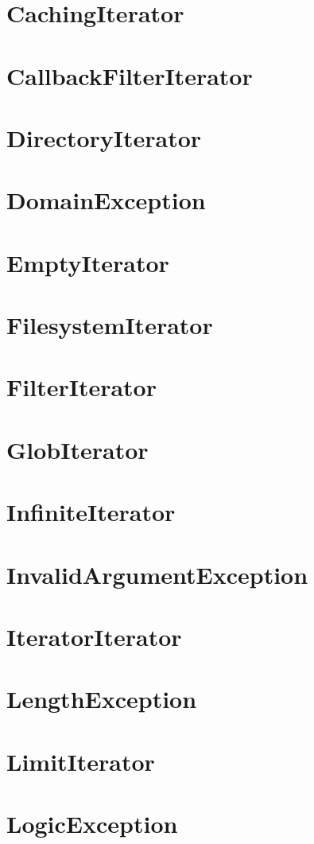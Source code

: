 \section{CachingIterator}
\section{CallbackFilterIterator}
\section{DirectoryIterator}
\section{DomainException}
\section{EmptyIterator}
\section{FilesystemIterator}
\section{FilterIterator}
\section{GlobIterator}

\section{InfiniteIterator}
\section{InvalidArgumentException}
\section{IteratorIterator}
\section{LengthException}
\section{LimitIterator}
\section{LogicException}

